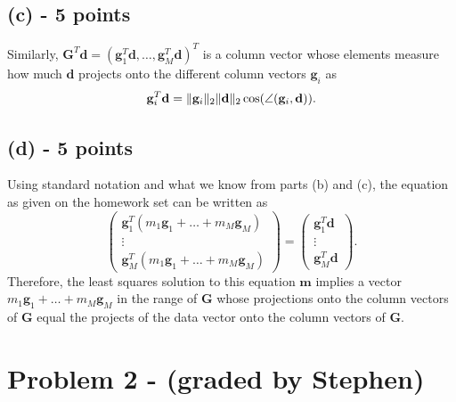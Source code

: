 \documentclass[11pt]{article}
\begin{document}
\subsection*{(c) - 5 points}
Similarly, $\mathbf{G}^T\mathbf{d} = \left( \mathbf{g}_1^T \mathbf{d}, \hdots, \mathbf{g}_M^T \mathbf{d} \right)^T$ is a column vector whose elements measure how much $\mathbf{d}$ projects onto the different column vectors $\mathbf{g}_i$ as
\begin{equation}
\mathbf{g}_i^T\mathbf{d} = \lVert\mathbf{g}_i\rVert_2\lVert\mathbf{d}\rVert_2\cos(\angle(\mathbf{g}_i,\mathbf{d})).
\end{equation}

\subsection*{(d) - 5 points}
Using standard notation and what we know from parts (b) and (c), the equation as given on the homework set can be written as
\begin{equation}
\begin{pmatrix}
\mathbf{g}_1^T (m_1\mathbf{g}_1 + \hdots + m_M \mathbf{g}_M)\\
\vdots\\
\mathbf{g}_M^T (m_1\mathbf{g}_1 + \hdots + m_M \mathbf{g}_M)
\end{pmatrix}
=
\begin{pmatrix}
\mathbf{g}_1^T \mathbf{d}\\
\vdots\\
\mathbf{g}_M^T \mathbf{d}
\end{pmatrix}.
\end{equation}
Therefore, the least squares solution to this equation $\mathbf{m}$ implies a vector $m_1\mathbf{g}_1 + \hdots + m_M \mathbf{g}_M$ in the range of $\mathbf{G}$ whose projections onto the column vectors of $\mathbf{G}$ equal the projects of the data vector onto the column vectors of $\mathbf{G}$.

\newpage

\section*{Problem 2 - (graded by Stephen)}
\end{document}
